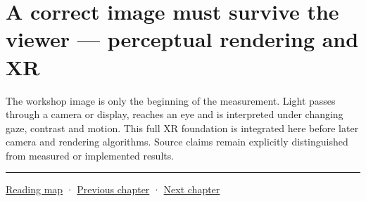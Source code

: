 \section{A correct image must survive the viewer --- perceptual rendering and XR}\label{04-visual-computing-ii-ch041-a-correct-image-must-survive-the-viewer-perceptual-rendering-and-xr}

The workshop image is only the beginning of the measurement. Light passes through a camera or display, reaches an eye and is interpreted under changing gaze, contrast and motion. This full XR foundation is integrated here before later camera and rendering algorithms. Source claims remain explicitly distinguished from measured or implemented results.

\begin{center}\rule{0.5\linewidth}{0.5pt}\end{center}

\hyperref[volume-reading-map]{Reading map} · \hyperref[04-visual-computing-ii-ch040]{Previous chapter} · \hyperref[04-visual-computing-ii-ch042]{Next chapter}
